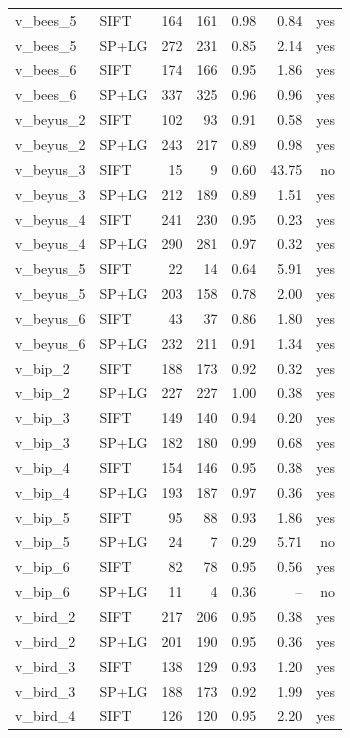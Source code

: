 \begin{longtable}{llrrrrr}
v\_bees\_5 & SIFT & 164 & 161 & 0.98 & 0.84 & yes \\
v\_bees\_5 & SP+LG & 272 & 231 & 0.85 & 2.14 & yes \\
v\_bees\_6 & SIFT & 174 & 166 & 0.95 & 1.86 & yes \\
v\_bees\_6 & SP+LG & 337 & 325 & 0.96 & 0.96 & yes \\
v\_beyus\_2 & SIFT & 102 & 93 & 0.91 & 0.58 & yes \\
v\_beyus\_2 & SP+LG & 243 & 217 & 0.89 & 0.98 & yes \\
v\_beyus\_3 & SIFT & 15 & 9 & 0.60 & 43.75 & no \\
v\_beyus\_3 & SP+LG & 212 & 189 & 0.89 & 1.51 & yes \\
v\_beyus\_4 & SIFT & 241 & 230 & 0.95 & 0.23 & yes \\
v\_beyus\_4 & SP+LG & 290 & 281 & 0.97 & 0.32 & yes \\
v\_beyus\_5 & SIFT & 22 & 14 & 0.64 & 5.91 & yes \\
v\_beyus\_5 & SP+LG & 203 & 158 & 0.78 & 2.00 & yes \\
v\_beyus\_6 & SIFT & 43 & 37 & 0.86 & 1.80 & yes \\
v\_beyus\_6 & SP+LG & 232 & 211 & 0.91 & 1.34 & yes \\
v\_bip\_2 & SIFT & 188 & 173 & 0.92 & 0.32 & yes \\
v\_bip\_2 & SP+LG & 227 & 227 & 1.00 & 0.38 & yes \\
v\_bip\_3 & SIFT & 149 & 140 & 0.94 & 0.20 & yes \\
v\_bip\_3 & SP+LG & 182 & 180 & 0.99 & 0.68 & yes \\
v\_bip\_4 & SIFT & 154 & 146 & 0.95 & 0.38 & yes \\
v\_bip\_4 & SP+LG & 193 & 187 & 0.97 & 0.36 & yes \\
v\_bip\_5 & SIFT & 95 & 88 & 0.93 & 1.86 & yes \\
v\_bip\_5 & SP+LG & 24 & 7 & 0.29 & 5.71 & no \\
v\_bip\_6 & SIFT & 82 & 78 & 0.95 & 0.56 & yes \\
v\_bip\_6 & SP+LG & 11 & 4 & 0.36 & -- & no \\
v\_bird\_2 & SIFT & 217 & 206 & 0.95 & 0.38 & yes \\
v\_bird\_2 & SP+LG & 201 & 190 & 0.95 & 0.36 & yes \\
v\_bird\_3 & SIFT & 138 & 129 & 0.93 & 1.20 & yes \\
v\_bird\_3 & SP+LG & 188 & 173 & 0.92 & 1.99 & yes \\
v\_bird\_4 & SIFT & 126 & 120 & 0.95 & 2.20 & yes \\

\end{longtable}
